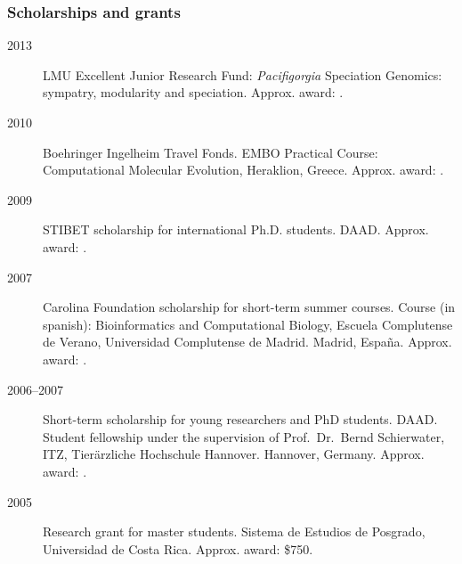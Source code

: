 \documentclass[letter,10pt]{article}
\begin{document}




\subsubsection*{Scholarships and grants}
\begin{description}
\item[2013] LMU Excellent Junior Research Fund: \emph{Pacifigorgia} Speciation Genomics: sympatry, modularity and speciation. Approx. award: .

\item[2010] Boehringer Ingelheim Travel Fonds. EMBO Practical Course: Computational Molecular Evolution, Heraklion, Greece. Approx. award: .

\item[2009]  STIBET scholarship for international Ph.D. students. DAAD. Approx. award: . 

\item[2007] Carolina Foundation scholarship for short-term summer courses. Course (in spanish): Bioinformatics and Computational Biology, Escuela Complutense de Verano, Universidad Complutense de Madrid. Madrid, Espa\~na. Approx. award: .

\item[2006--2007] Short-term scholarship for young researchers and PhD students. DAAD. Student fellowship under the supervision of Prof.~Dr.~Bernd Schierwater, ITZ, Tier\"arzliche Hochschule Hannover. Hannover, Germany. Approx. award: .

\item[2005] Research grant for master students. Sistema de Estudios de Posgrado, Universidad de Costa Rica. Approx. award: \$750.
\end{description}
\end{document}
